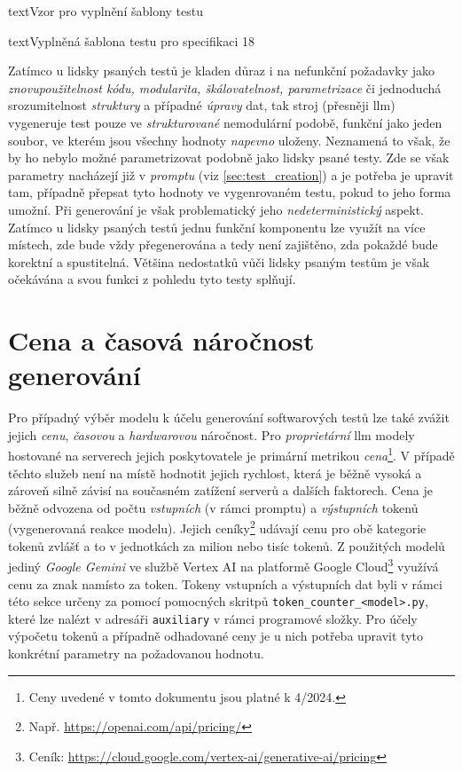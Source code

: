 \documentclass[czech, ma, kiv, he, iso690numb, pdf, viewonly]{fasthesis}
\begin{document}
\begin{code}{text}{Vzor pro vyplnění šablony testu \label{lst:template}}
{\begin{code}{text}{Vyplněná šablona testu pro specifikaci 18 \label{lst:spec18}}
{        Zatímco u lidsky psaných testů je kladen důraz i na nefunkční požadavky jako \textit{znovupoužitelnost kódu, modularita, škálovatelnost, parametrizace} či jednoduchá srozumitelnost \textit{struktury} a případné \textit{úpravy} dat, tak stroj (přesněji \Gls{llm}) vygeneruje test pouze ve \textit{strukturované} nemodulární podobě, funkční jako jeden soubor, ve kterém jsou všechny hodnoty \textit{napevno} uloženy. Neznamená to však, že by ho nebylo možné parametrizovat podobně jako lidsky psané testy. Zde se však parametry nacházejí již v \emph{promptu} (viz \ref{sec:test_creation}) a je potřeba je upravit tam, případně přepsat tyto hodnoty ve vygenrovaném testu, pokud to jeho forma umožní. Při generování je však problematický jeho \textit{nedeterministický} aspekt. Zatímco u lidsky psaných testů jednu funkční komponentu lze využít na více místech, zde bude vždy přegenerována a tedy není zajištěno, zda pokaždé bude korektní a spustitelná. Většina nedostatků vůči lidsky psaným testům je však očekávána a svou funkci z pohledu  tyto testy splňují.

    \section{Cena a časová náročnost generování} \label{sec:price_and_requirements}

    Pro případný výběr modelu k účelu generování softwarových testů lze také zvážit jejich \textit{cenu}, \textit{časovou} a \textit{hardwarovou} náročnost. Pro \textit{proprietární} \Gls{llm} modely hostované na serverech jejich poskytovatele je primární metrikou \textit{cena}\footnote{Ceny uvedené v tomto dokumentu jsou platné k 4/2024.}. V případě těchto služeb není na místě hodnotit jejich rychlost, která je běžně vysoká a zároveň silně závisí na současném zatížení serverů a dalších faktorech. Cena je běžně odvozena od počtu \textit{vstupních} (v rámci promptu) a \textit{výstupních} tokenů (vygenerovaná reakce modelu). Jejich ceníky\footnote{Např. \url{https://openai.com/api/pricing/}} udávají cenu pro obě kategorie tokenů zvlášť a to v jednotkách za milion nebo tisíc tokenů. Z použitých modelů jediný \textit{Google Gemini} ve službě Vertex AI na platformě Google Cloud\footnote{Ceník: \url{https://cloud.google.com/vertex-ai/generative-ai/pricing}} využívá cenu za znak namísto za token. Tokeny vstupních a výstupních dat byli v rámci této sekce určeny za pomocí pomocných skritpů \verb|token_counter_<model>.py|, které lze nalézt v adresáři \verb|auxiliary| v rámci programové složky. Pro účely výpočetu tokenů a případně odhadované ceny je u nich potřeba upravit tyto konkrétní parametry na požadovanou hodnotu.

}
\end{code}}
\end{code}
\end{document}
